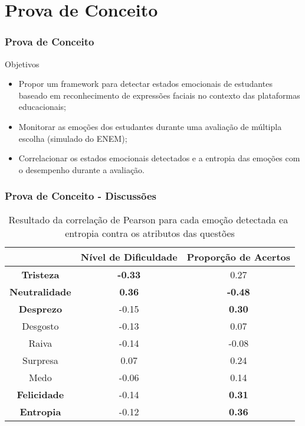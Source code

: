 \section{Prova de Conceito}

\begin{frame}
 \frametitle{Prova de Conceito}
 \begin{block}{Objetivos}
\begin{itemize}
\pause
\item Propor um framework para detectar estados emocionais de estudantes baseado em reconhecimento de expressões faciais no contexto das plataformas educacionais;
\pause
\item Monitorar as emoções dos estudantes durante uma avaliação de múltipla escolha (simulado do ENEM);
\pause
\item Correlacionar os estados emocionais detectados e a entropia das emoções com o desempenho durante a avaliação.
\end{itemize}
\end{block}
\end{frame}


\begin{frame}
\frametitle{Prova de Conceito - Discussões}
\begin{table}[]\footnotesize
\centering
\caption{Resultado​ ​da​ ​correla\c{c}\~ao​ ​de​ ​Pearson​ ​para​ ​cada​ ​emo\c{c}\~ao​ ​detectada
e​ ​a​ ​entropia​ ​contra​ ​os​ ​atributos​ ​das​ ​quest\~oes}
\label{my-label}
\begin{tabular}{|c|c|c|}
\hline
                      & \textbf{Nível de Dificuldade} & \textbf{Proporção de Acertos} \\ \hline
\textbf{Tristeza}     & \textbf{-0.33}                & 0.27                          \\ \hline
\textbf{Neutralidade} & \textbf{0.36}                 & \textbf{-0.48}                \\ \hline
\textbf{Desprezo}     & -0.15                         & \textbf{0.30}                 \\ \hline
Desgosto              & -0.13                         & 0.07                          \\ \hline
Raiva                 & -0.14                         & -0.08                         \\ \hline
Surpresa              & 0.07                          & 0.24                          \\ \hline
Medo                  & -0.06                         & 0.14                          \\ \hline
\textbf{Felicidade}   & -0.14                         & \textbf{0.31}                 \\ \hline
\textbf{Entropia}     & -0.12                         & \textbf{0.36}                 \\ \hline
\end{tabular}
\end{table}
\end{frame}


